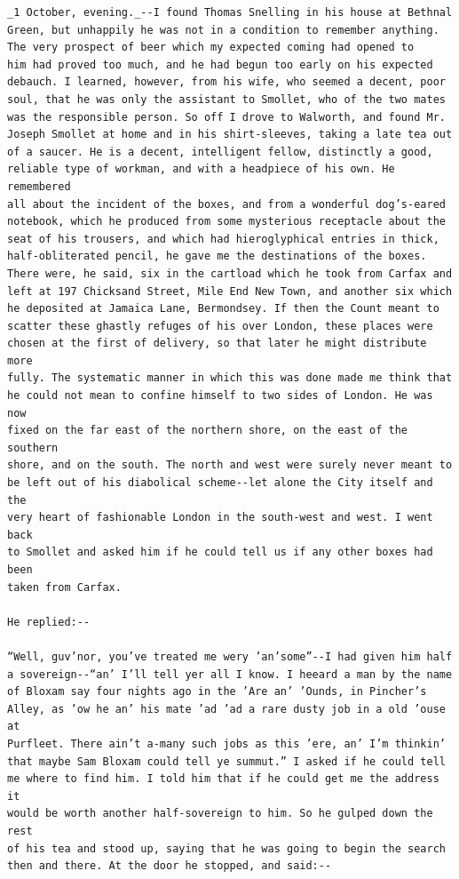 \documentclass{article}
\begin{document}
\begin{verbatim}
_1 October, evening._--I found Thomas Snelling in his house at Bethnal
Green, but unhappily he was not in a condition to remember anything.
The very prospect of beer which my expected coming had opened to
him had proved too much, and he had begun too early on his expected
debauch. I learned, however, from his wife, who seemed a decent, poor
soul, that he was only the assistant to Smollet, who of the two mates
was the responsible person. So off I drove to Walworth, and found Mr.
Joseph Smollet at home and in his shirt-sleeves, taking a late tea out
of a saucer. He is a decent, intelligent fellow, distinctly a good,
reliable type of workman, and with a headpiece of his own. He remembered
all about the incident of the boxes, and from a wonderful dog’s-eared
notebook, which he produced from some mysterious receptacle about the
seat of his trousers, and which had hieroglyphical entries in thick,
half-obliterated pencil, he gave me the destinations of the boxes.
There were, he said, six in the cartload which he took from Carfax and
left at 197 Chicksand Street, Mile End New Town, and another six which
he deposited at Jamaica Lane, Bermondsey. If then the Count meant to
scatter these ghastly refuges of his over London, these places were
chosen at the first of delivery, so that later he might distribute more
fully. The systematic manner in which this was done made me think that
he could not mean to confine himself to two sides of London. He was now
fixed on the far east of the northern shore, on the east of the southern
shore, and on the south. The north and west were surely never meant to
be left out of his diabolical scheme--let alone the City itself and the
very heart of fashionable London in the south-west and west. I went back
to Smollet and asked him if he could tell us if any other boxes had been
taken from Carfax.

He replied:--

“Well, guv’nor, you’ve treated me wery ’an’some”--I had given him half
a sovereign--“an’ I’ll tell yer all I know. I heeard a man by the name
of Bloxam say four nights ago in the ’Are an’ ’Ounds, in Pincher’s
Alley, as ’ow he an’ his mate ’ad ’ad a rare dusty job in a old ’ouse at
Purfleet. There ain’t a-many such jobs as this ’ere, an’ I’m thinkin’
that maybe Sam Bloxam could tell ye summut.” I asked if he could tell
me where to find him. I told him that if he could get me the address it
would be worth another half-sovereign to him. So he gulped down the rest
of his tea and stood up, saying that he was going to begin the search
then and there. At the door he stopped, and said:--


\end{verbatim}
\end{document}
